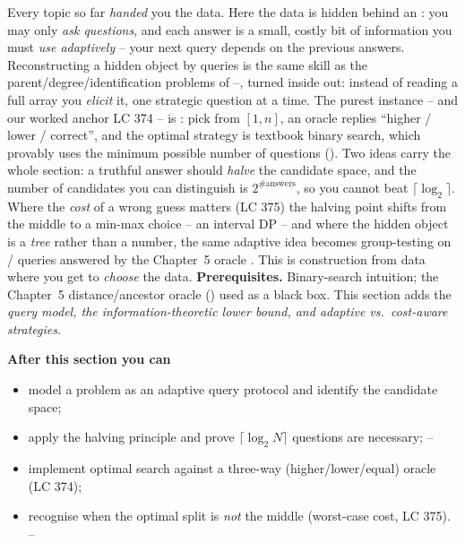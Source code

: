 \begin{topicintro}
Every topic so far \emph{handed} you the data. Here the data is hidden behind an :
you may only \emph{ask questions}, and each answer is a small, costly bit of information you must
\emph{use adaptively} -- your next query depends on the previous answers. Reconstructing a hidden
object by queries is the same skill as the parent/degree/identification problems of
--, turned inside out: instead of reading a full array you
\emph{elicit} it, one strategic question at a time. The purest instance -- and our worked anchor
LC 374 -- is : pick from $[1,n]$, an oracle replies ``higher / lower /
correct'', and the optimal strategy is textbook binary search, which provably uses the minimum
possible number of questions (). Two ideas carry the whole section: a truthful
answer should \emph{halve} the candidate space, and the number of candidates you can distinguish is
$2^{\text{\#answers}}$, so you cannot beat $\lceil\log_2\rceil$. Where the \emph{cost} of a wrong
guess matters (LC 375) the halving point shifts from the middle to a min-max choice -- an interval
DP -- and where the hidden object is a \emph{tree} rather than a number, the same adaptive idea
becomes group-testing on / queries answered by the Chapter~5 oracle
. This is construction from data where you get to \emph{choose} the data.
\textbf{Prerequisites.} Binary-search intuition; the Chapter~5 distance/ancestor oracle
() used as a black box. This section adds the \emph{query model, the
information-theoretic lower bound, and adaptive vs.\ cost-aware strategies}.

\textbf{After this section you can}
\begin{itemize}[nosep]
  \item model a problem as an adaptive query protocol and identify the candidate space;        \hfill{}
  \item apply the halving principle and prove $\lceil\log_2 N\rceil$ questions are necessary;   \hfill{}--
  \item implement optimal search against a three-way (higher/lower/equal) oracle (LC 374);      \hfill{}
  \item recognise when the optimal split is \emph{not} the middle (worst-case cost, LC 375).    \hfill{}--
\end{itemize}
\end{topicintro}

